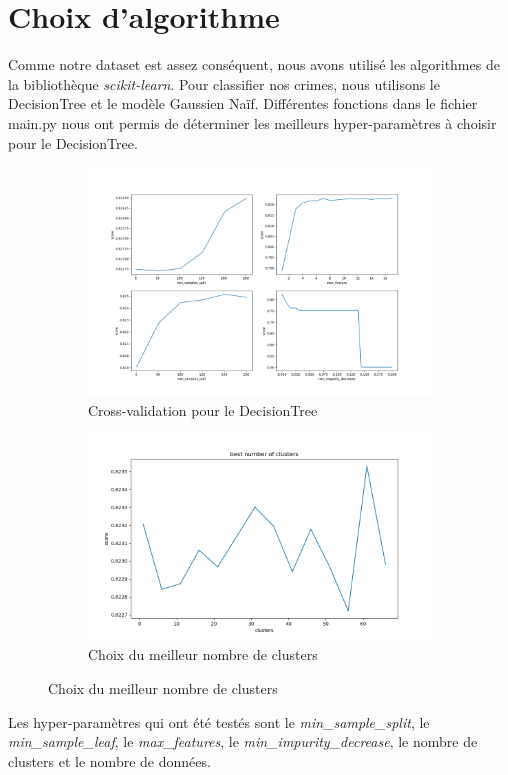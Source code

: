 \documentclass{article}
\begin{document}
    \section{Choix d'algorithme}
    Comme notre dataset est assez conséquent, nous avons utilisé les algorithmes 
    de la bibliothèque \textit{scikit-learn}.
    Pour classifier nos crimes, nous utilisons le DecisionTree et le modèle Gaussien Naïf.
    Différentes fonctions dans le fichier main.py nous ont permis de déterminer
    les meilleurs hyper-paramètres à choisir pour le DecisionTree.
    \begin{figure}[H]
	    \centering
	    \begin{subfigure}{.45\textwidth}
		    \includegraphics[scale=.2]{images/bestParamDecisionTree.png}
		    \caption{Cross-validation pour le DecisionTree}
	    \end{subfigure}
	    \begin{subfigure}{.45\textwidth}
		    \includegraphics[scale=.3]{images/bestNumClusters.png}
		    \caption{Choix du meilleur nombre de clusters}
	    \end{subfigure}
    \end{figure}
    Les hyper-paramètres qui ont été testés sont le \textit{min\_sample\_split}, le \textit{min\_sample\_leaf},
    le \textit{max\_features}, le \textit{min\_impurity\_decrease}, le nombre de clusters et le 
    nombre de données.
\end{document}
